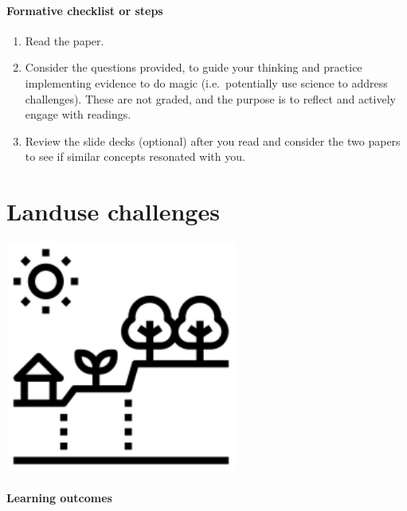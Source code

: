 \documentclass[
]{book}
\providecommand{\tightlist}{%
  \setlength{\itemsep}{0pt}\setlength{\parskip}{0pt}}
\begin{document}
\hypertarget{formative-checklist-or-steps-2}{%
\subsubsection*{Formative checklist or steps}\label{formative-checklist-or-steps-2}}

\begin{enumerate}
\def\labelenumi{\arabic{enumi}.}
\tightlist
\item
  Read the paper.\\
\item
  Consider the questions provided, to guide your thinking and practice implementing evidence to do magic (i.e.~potentially use science to address challenges). These are not graded, and the purpose is to reflect and actively engage with readings.\\
\item
  Review the slide decks (optional) after you read and consider the two papers to see if similar concepts resonated with you.
\end{enumerate}

\hypertarget{landuse}{%
\chapter{Landuse challenges}\label{landuse}}

\includegraphics[width=3in,height=\textheight]{./landuse.png}

\hypertarget{learning-outcomes-4}{%
\subsubsection*{Learning outcomes}\label{learning-outcomes-4}}
\end{document}
